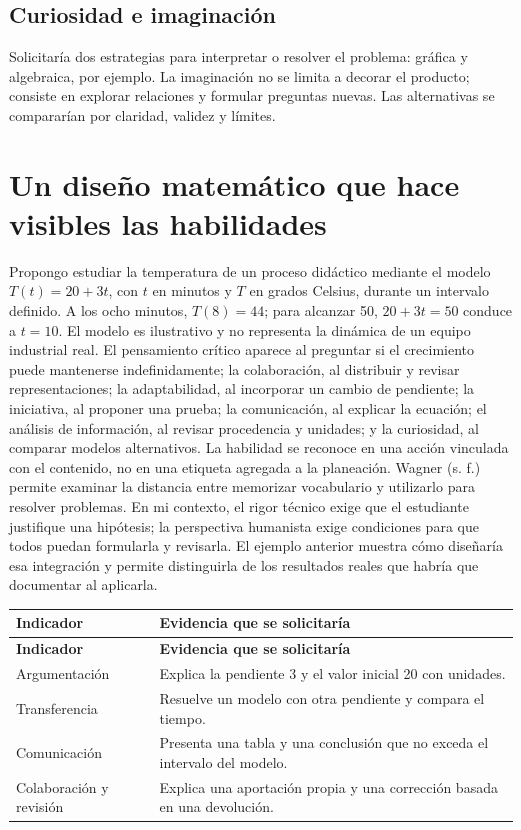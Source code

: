 \documentclass[spanish,letterpaper,oneside]{article}
\begin{document}
\subsection{Curiosidad e imaginación}
Solicitaría dos estrategias para interpretar o resolver el problema: gráfica y algebraica, por ejemplo. La imaginación no se limita a decorar el producto; consiste en explorar relaciones y formular preguntas nuevas. Las alternativas se compararían por claridad, validez y límites.
\section{Un diseño matemático que hace visibles las habilidades}
Propongo estudiar la temperatura de un proceso didáctico mediante el modelo $T(t)=20+3t$, con $t$ en minutos y $T$ en grados Celsius, durante un intervalo definido. A los ocho minutos, $T(8)=44$; para alcanzar 50, $20+3t=50$ conduce a $t=10$. El modelo es ilustrativo y no representa la dinámica de un equipo industrial real.
El pensamiento crítico aparece al preguntar si el crecimiento puede mantenerse indefinidamente; la colaboración, al distribuir y revisar representaciones; la adaptabilidad, al incorporar un cambio de pendiente; la iniciativa, al proponer una prueba; la comunicación, al explicar la ecuación; el análisis de información, al revisar procedencia y unidades; y la curiosidad, al comparar modelos alternativos. La habilidad se reconoce en una acción vinculada con el contenido, no en una etiqueta agregada a la planeación.
Wagner (s. f.) permite examinar la distancia entre memorizar vocabulario y utilizarlo para resolver problemas. En mi contexto, el rigor técnico exige que el estudiante justifique una hipótesis; la perspectiva humanista exige condiciones para que todos puedan formularla y revisarla. El ejemplo anterior muestra cómo diseñaría esa integración y permite distinguirla de los resultados reales que habría que documentar al aplicarla.

{\small{}\renewcommand{\arraystretch}{1.25}
\begin{longtable}{|>{\raggedright\arraybackslash}p{}|>{\raggedright\arraybackslash}p{}|}\hline
\rowcolor{iiiepePale} \textbf{Indicador} & \textbf{Evidencia que se solicitaría} \\\hline
\endfirsthead
\hline
\rowcolor{iiiepePale} \textbf{Indicador} & \textbf{Evidencia que se solicitaría} \\\hline
\endhead
Argumentación & Explica la pendiente 3 y el valor inicial 20 con unidades. \\\hline
Transferencia & Resuelve un modelo con otra pendiente y compara el tiempo. \\\hline
Comunicación & Presenta una tabla y una conclusión que no exceda el intervalo del modelo. \\\hline
Colaboración y revisión & Explica una aportación propia y una corrección basada en una devolución. \\\hline
\end{longtable}}
\end{document}
